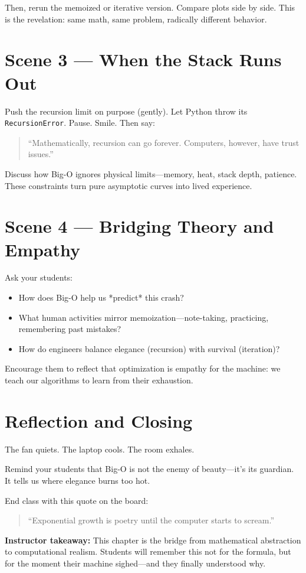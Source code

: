Then, rerun the memoized or iterative version.  
Compare plots side by side.  
This is the revelation: same math, same problem, radically different behavior.

\section*{Scene 3 --- When the Stack Runs Out}

Push the recursion limit on purpose (gently).  
Let Python throw its \texttt{RecursionError}.  
Pause. Smile. Then say:

\begin{quote}
“Mathematically, recursion can go forever.  
Computers, however, have trust issues.”  
\end{quote}

Discuss how Big-O ignores physical limits—memory, heat, stack depth, patience.  
These constraints turn pure asymptotic curves into lived experience.

\section*{Scene 4 --- Bridging Theory and Empathy}

Ask your students:

\begin{itemize}
  \item How does Big-O help us *predict* this crash?
  \item What human activities mirror memoization—note-taking, practicing, remembering past mistakes?
  \item How do engineers balance elegance (recursion) with survival (iteration)?
\end{itemize}

Encourage them to reflect that optimization is empathy for the machine:  
we teach our algorithms to learn from their exhaustion.

\section*{Reflection and Closing}

The fan quiets.  
The laptop cools.  
The room exhales.

Remind your students that Big-O is not the enemy of beauty—it’s its guardian.  
It tells us where elegance burns too hot.  

End class with this quote on the board:

\begin{quote}
“Exponential growth is poetry until the computer starts to scream.”  
\end{quote}

\textbf{Instructor takeaway:}  
This chapter is the bridge from mathematical abstraction to computational realism.  
Students will remember this not for the formula, but for the moment their machine sighed—and they finally understood why.


